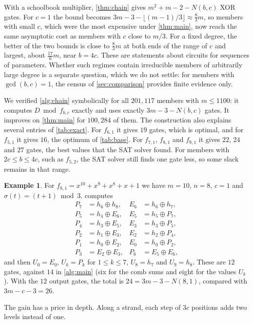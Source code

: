\documentclass{ieeeaccess}
\theoremstyle{plain}
\theoremstyle{definition}
\newtheorem{example}[theorem]{Example}
\newcommand{\xor}{\oplus}
\begin{document}
With a schoolbook multiplier, \cref{thm:chain} gives $m^2+m-2-N(b,c)$ XOR
gates. For $c=1$ the bound becomes $3m-3-\lfloor(m-1)/3\rfloor\approx\tfrac83m$, so
members with small $c$, which were the most expensive under \cref{thm:main},
now reach the same asymptotic cost as members with $c$ close to $m/3$. For a
fixed degree, the better of the two bounds is close to $\tfrac83m$ at both ends
of the range of $c$ and largest, about $\tfrac{17}6m$, near $b=4c$.
These are statements about circuits for sequences of parameters. Whether such
regimes contain irreducible members of arbitrarily large degree is a separate
question, which we do not settle: for members with $\gcd(b,c)=1$, the census of
\cref{sec:comparison} provides finite evidence only.

We verified \cref{alg:chain} symbolically for all $201,117$ members with
$m\le1100$: it computes $D\bmod f_{b,c}$ exactly and uses exactly
$3m-3-N(b,c)$ gates. It improves on \cref{thm:main} for $100,284$ of them.
The construction also explains several entries of \cref{tab:exact}. For
$f_{6,1}$ it gives $19$ gates, which is optimal, and for $f_{5,1}$ it gives
$16$, the optimum of \cref{tab:base}. For $f_{7,1}$, $f_{8,1}$ and $f_{9,1}$ it
gives $22$, $24$ and $27$ gates, the best values that the SAT solver found.
For members with $2c\le b\le4c$, such as $f_{5,2}$, the SAT solver still finds
one gate less, so some slack remains in that range.

\begin{example}\label{ex:chain}
For $f_{8,1}=x^{10}+x^9+x^8+x+1$ we have $m=10$, $n=8$, $c=1$ and
$\sigma(t)=(t+1)\bmod3$.  computes
\begin{align*}
  P_7&=h_6\xor h_8, & E_6&=h_6\xor h_7,\\
  P_5&=h_4\xor E_6, & E_5&=h_5\xor P_7,\\
  P_4&=h_3\xor E_5, & E_3&=h_3\xor P_5,\\
  P_2&=h_1\xor E_3, & E_2&=h_2\xor P_4,\\
  P_1&=h_0\xor E_2, & E_0&=h_0\xor P_2,\\
  P_3&=E_2\xor E_3, & P_6&=E_5\xor E_6,
\end{align*}
and then $U_0=E_0$, $U_k=P_k$ for $1\le k\le7$, $U_8=h_7$ and $U_9=h_8$. These
are $12$ gates, against $14$ in \cref{alg:main} (six for the comb sums and
eight for the values $U_k$). With the $12$ output gates, the total is
$24=3m-3-N(8,1)$, compared with $3m-c-3=26$.
\end{example}

The gain has a price in depth. Along a strand, each step of $3c$ positions adds
two levels instead of one.
\end{document}
